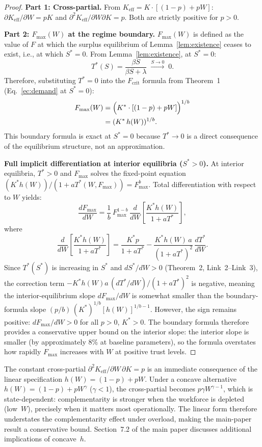 \documentclass[msom,dblanonrev]{informs4}
\newcommand{\Keff}{K_{\mathrm{eff}}}
\begin{document}
\begin{proof}
\textbf{Part 1: Cross-partial.} From $\Keff = K \cdot [(1-p) + pW]$: $\partial \Keff / \partial W = pK$ and $\partial^2 \Keff / \partial W \partial K = p$. Both are strictly positive for $p > 0$.

\textbf{Part 2: $F_{\max}(W)$ at the regime boundary.} $F_{\max}(W)$ is defined as the value of $F$ at which the surplus equilibrium of Lemma~\ref{lem:existence} ceases to exist, i.e., at which $S^* = 0$. From Lemma~\ref{lem:existence}, at $S^* = 0$:
\[
T^*(S) = \frac{\beta S}{\beta S + \lambda} \;\xrightarrow{S \to 0}\; 0.
\]
Therefore, substituting $T^* = 0$ into the $F_{\mathrm{crit}}$ formula from Theorem~1 (Eq.~\ref{ec:demand} at $S^* = 0$):
\begin{align*}
F_{\max}(W) &= \Bigl(K^* \cdot [(1-p) + pW]\Bigr)^{1/b} \\
  &= (K^*\,h(W))^{1/b}.
\end{align*}
This boundary formula is exact at $S^* = 0$ because $T^* \to 0$ is a direct consequence of the equilibrium structure, not an approximation.

\textbf{Full implicit differentiation at interior equilibria ($S^* > 0$).} At interior equilibria, $T^* > 0$ and $F_{\max}$ solves the fixed-point equation $(K^* h(W))/(1 + aT^*(W,F_{\max})) = F_{\max}^b$. Total differentiation with respect to $W$ yields:
\[
\frac{dF_{\max}}{dW} = \frac{1}{b}\,F_{\max}^{1-b}\,\frac{d}{dW}\!\left[\frac{K^* h(W)}{1 + aT^*}\right],
\]
where
\[
\frac{d}{dW}\!\left[\frac{K^* h(W)}{1 + aT^*}\right] = \frac{K^* p}{1+aT^*} - \frac{K^* h(W)\,a}{(1+aT^*)^2}\,\frac{dT^*}{dW}.
\]
Since $T^*(S^*)$ is increasing in $S^*$ and $dS^*/dW > 0$ (Theorem~2, Link~2--Link~3), the correction term $-K^* h(W) a\,(dT^*/dW)/(1+aT^*)^2$ is negative, meaning the interior-equilibrium slope $dF_{\max}/dW$ is somewhat smaller than the boundary-formula slope $(p/b)\,(K^*)^{1/b}[h(W)]^{1/b-1}$. However, the sign remains positive: $dF_{\max}/dW > 0$ for all $p > 0$, $K^* > 0$. The boundary formula therefore provides a conservative upper bound on the interior slope: the interior slope is smaller (by approximately 8\% at baseline parameters), so the formula overstates how rapidly $F_{\max}$ increases with $W$ at positive trust levels. \Halmos
\end{proof}

\begin{remark}
The constant cross-partial $\partial^2 \Keff / \partial W\,\partial K = p$ is an immediate consequence of the linear specification $h(W) = (1-p) + pW$. Under a concave alternative $h(W) = (1-p) + pW^\gamma$ ($\gamma < 1$), the cross-partial becomes $p\gamma W^{\gamma-1}$, which is state-dependent: complementarity is stronger when the workforce is depleted (low~$W$), precisely when it matters most operationally. The linear form therefore understates the complementarity effect under overload, making the main-paper result a conservative bound. Section~7.2 of the main paper discusses additional implications of concave~$h$.
\end{remark}
\end{document}
